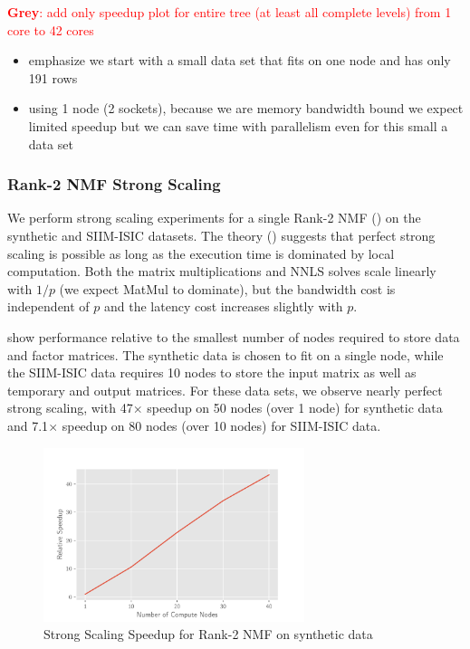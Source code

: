 \documentclass[conference,compsoc]{IEEEtran}
\newcommand{\GB}[1]{\textcolor{red}{\textbf{Grey}: #1}}
\newcommand{\image}{SIIM-ISIC}
\begin{document}
\GB{add only speedup plot for entire tree (at least all complete levels) from 1 core to 42 cores}

\begin{itemize}
	\item emphasize we start with a small data set that fits on one node and has only 191 rows
	\item using 1 node (2 sockets), because we are memory bandwidth bound we expect limited speedup but we can save time with parallelism even for this small a data set
\end{itemize}

\subsubsection{Rank-2 NMF Strong Scaling}

We perform strong scaling experiments for a single Rank-2 NMF () on the synthetic and \image{} datasets.
The theory () suggests that perfect strong scaling is possible as long as the execution time is dominated by local computation.
Both the matrix multiplications and NNLS solves scale linearly with $1/p$ (we expect MatMul to dominate), but the bandwidth cost is independent of $p$ and the latency cost increases slightly with $p$.

 show performance relative to the smallest number of nodes required to store data and factor matrices.
The synthetic data is chosen to fit on a single node, while the \image{} data requires 10 nodes to store the input matrix as well as temporary and output matrices.
For these data sets, we observe nearly perfect strong scaling, with 47$\times$ speedup on 50 nodes (over 1 node) for synthetic data and 7.1$\times$ speedup on 80 nodes (over 10 nodes) for \image{} data.

\begin{figure}
\begin{center}
\includegraphics[height=2in, width=\columnwidth]{plots/synthetic_rank2_speedup.pdf}
\caption{Strong Scaling Speedup for Rank-2 NMF on synthetic data}
\label{fig:synrank2speedup}
\end{center}
\end{figure}
\end{document}
